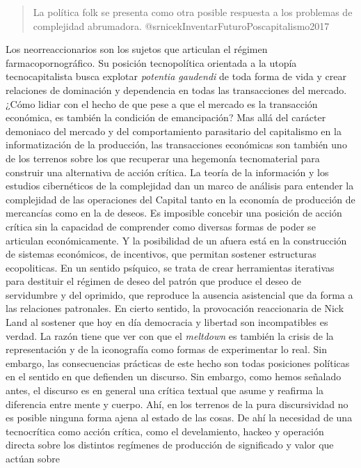 \documentclass[
]{article}
\begin{document}
\begin{quote}
La política folk se presenta como otra posible respuesta a los problemas
de complejidad abrumadora. @srnicekInventarFuturoPoscapitalismo2017
\end{quote}

Los neorreaccionarios son los sujetos que articulan el régimen
farmacopornográfico. Su posición tecnopolítica orientada a la utopía
tecnocapitalista busca explotar \emph{potentia gaudendi} de toda forma
de vida y crear relaciones de dominación y dependencia en todas las
transacciones del mercado. ¿Cómo lidiar con el hecho de que pese a que
el mercado es la transacción económica, es también la condición de
emancipación? Mas allá del carácter demoniaco del mercado y del
comportamiento parasitario del capitalismo en la informatización de la
producción, las transacciones económicas son también uno de los terrenos
sobre los que recuperar una hegemonía tecnomaterial para construir una
alternativa de acción crítica. La teoría de la información y los
estudios cibernéticos de la complejidad dan un marco de análisis para
entender la complejidad de las operaciones del Capital tanto en la
economía de producción de mercancías como en la de deseos. Es imposible
concebir una posición de acción crítica sin la capacidad de comprender
como diversas formas de poder se articulan económicamente. Y la
posibilidad de un afuera está en la construcción de sistemas económicos,
de incentivos, que permitan sostener estructuras ecopoliticas. En un
sentido psíquico, se trata de crear herramientas iterativas para
destituir el régimen de deseo del patrón que produce el deseo de
servidumbre y del oprimido, que reproduce la ausencia asistencial que da
forma a las relaciones patronales. En cierto sentido, la provocación
reaccionaria de Nick Land al sostener que hoy en día democracia y
libertad son incompatibles es verdad. La razón tiene que ver con que el
\emph{meltdown} es también la crisis de la representación y de la
iconografía como formas de experimentar lo real. Sin embargo, las
consecuencias prácticas de este hecho son todas posiciones políticas en
el sentido en que defienden un discurso. Sin embargo, como hemos
señalado antes, el discurso es en general una crítica textual que asume
y reafirma la diferencia entre mente y cuerpo. Ahí, en los terrenos de
la pura discursividad no es posible ninguna forma ajena al estado de las
cosas. De ahí la necesidad de una tecnocrítica como acción crítica, como
el develamiento, hackeo y operación directa sobre los distintos
regímenes de producción de significado y valor que actúan sobre
\end{document}
